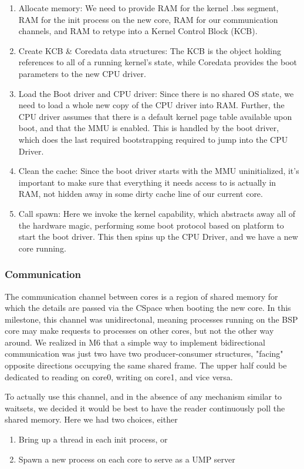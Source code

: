 \begin{enumerate}
    \item Allocate memory: We need to provide RAM for the kernel .bss segment, RAM for the init process on the new core, RAM for our communication channels, and RAM to retype into a Kernel Control Block (KCB).
    \item Create KCB \& Coredata data structures: The KCB is the object holding references to all of a running kernel’s state, while Coredata provides the boot parameters to the new CPU driver.
    \item Load the Boot driver and CPU driver: Since there is no shared OS state, we need to load a whole new copy of the CPU driver into RAM. Further, the CPU driver assumes that there is a default kernel page table available upon boot, and that the MMU is enabled. This is handled by the boot driver, which does the last required bootstrapping required to jump into the CPU Driver.
    \item Clean the cache: Since the boot driver starts with the MMU uninitialized, it's important to make sure that everything it needs access to is actually in RAM, not hidden away in some dirty cache line of our current core.
    \item Call spawn: Here we invoke the kernel capability, which abstracts away all of the hardware magic, performing some boot protocol based on platform to start the boot driver. This then spins up the CPU Driver, and we have a new core running.
\end{enumerate}

\subsubsection*{Communication} \label{sec:m5_communication}
The communication channel between cores is a region of shared memory for which the details are passed via the CSpace when booting the new core. In this milestone, this channel was unidirectonal, meaning processes running on the BSP core may make requests to processes on other cores, but not the other way around. We realized in M6 that a simple way to implement bidirectional communication was just two have two producer-consumer structures, "facing" opposite directions occupying the same shared frame. The upper half could be dedicated to reading on core0, writing on core1, and vice versa.

To actually use this channel, and in the absence of any mechanism similar to waitsets, we decided it would be best to have the reader continuously poll the shared memory. Here we had two choices, either
\begin{enumerate}
    \item Bring up a thread in each init process, or
    \item Spawn a new process on each core to serve as a UMP server
\end{enumerate}

